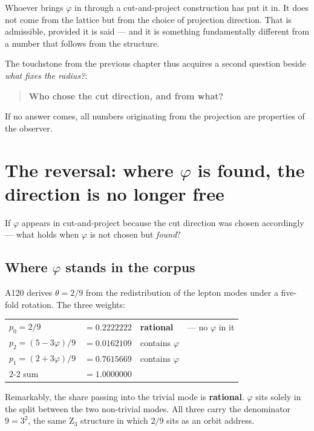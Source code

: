 Whoever brings $\varphi$ in through a cut-and-project construction has
put it in. It does not come from the lattice but from the choice of
projection direction. That is admissible, provided it is said --- and
it is something fundamentally different from a number that follows from
the structure.

The touchstone from the previous chapter thus acquires a second
question beside \emph{what fixes the radius?}:

\begin{quote}
\textbf{Who chose the cut direction, and from what?}
\end{quote}

If no answer comes, all numbers originating from the projection are
properties of the observer.

\chapter{The reversal: where \texorpdfstring{$\varphi$}{phi} is found,
the direction is no longer free}

If $\varphi$ appears in cut-and-project because the cut direction was
chosen accordingly --- what holds when $\varphi$ is not chosen but
\emph{found}?

\section{Where \texorpdfstring{$\varphi$}{phi} stands in the corpus}

A120 derives $\theta = 2/9$ from the redistribution of the lepton modes
under a five-fold rotation. The three weights:
\begin{center}
\begin{tabular}{llll}
$p_0 = 2/9$ & $= 0.2222222$ & \textbf{rational} & --- no $\varphi$ in it \\
$p_2 = (5 - 3\varphi)/9$ & $= 0.0162109$ & contains $\varphi$ & \\
$p_1 = (2 + 3\varphi)/9$ & $= 0.7615669$ & contains $\varphi$ & \\
\cmidrule{2-2}
sum & $= 1.0000000$ & & \\
\end{tabular}
\end{center}

Remarkably, the share passing into the trivial mode is
\textbf{rational}. $\varphi$ sits solely in the split between the two
non-trivial modes. All three carry the denominator $9 = 3^2$, the same
Z$_3$ structure in which $2/9$ sits as an orbit address.

